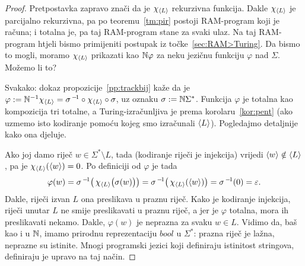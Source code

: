 \begin{proof}
Pretpostavka zapravo znači da je $\chi_{\langle L\rangle}$ rekurzivna funkcija. Dakle $\chi_{\langle L\rangle}$ je parcijalno rekurzivna, pa po teoremu~\ref{tm:pir} postoji RAM-program koji je računa; i totalna je, pa taj RAM-program stane za svaki ulaz. Na taj RAM-program htjeli bismo primijeniti postupak iz točke~\ref{sec:RAM>Turing}. Da bismo to mogli, moramo $\chi_{\langle L\rangle}$ prikazati kao ${\mathbb N}\varphi$ za neku jezičnu funkciju $\varphi$ nad $\Sigma$. Možemo li to?

Svakako: dokaz propozicije~\ref{pp:trackbij} kaže da je $\varphi:={\mathbb N}^{-1}\chi_{\langle L\rangle}=\sigma^{\,-\!1}\circ\chi_{\langle L\rangle}\circ\sigma$, uz oznaku $\sigma:={\mathbb N}\Sigma^*$. Funkcija $\varphi$ je totalna kao kompozicija tri totalne, a Turing-izračunljiva je prema korolaru~\ref{kor:pent} (ako uzmemo isto kodiranje pomoću kojeg smo izračunali $\langle L\rangle$). Pogledajmo detaljnije kako ona djeluje.

Ako joj damo riječ $w\in\Sigma^*\setminus L$, tada (kodiranje riječi je injekcija) vrijedi $\langle w\rangle\notin\langle L\rangle$, pa je $\chi_{\langle L\rangle}(\langle w\rangle)=0$. Po definiciji od $\varphi$ je tada
\begin{equation}
    \varphi(w)=\sigma^{\,-\!1}\bigl(\,\chi_{\langle L\rangle}\bigl(\sigma(w)\bigr)\bigr)=\sigma^{\,-\!1}\bigl(\,\chi_{\langle L\rangle}(\langle w\rangle)\bigr)=\sigma^{\,-\!1}(0)=\varepsilon\text.
\end{equation}
Dakle, riječi izvan $L$ ona preslikava u praznu riječ. Kako je kodiranje injekcija, riječi unutar $L$ ne smije preslikavati u praznu riječ, a jer je $\varphi$ totalna, mora ih preslikavati nekamo. Dakle, $\varphi(w)$ je neprazna za svaku $w\in L$.
Vidimo da, baš kao i u ${\mathbb N}$, imamo prirodnu reprezentaciju $bool$ u $\Sigma^*$: prazna riječ je lažna, neprazne su istinite. Mnogi programski jezici koji definiraju istinitost stringova, definiraju je upravo na taj način.



\end{proof}
